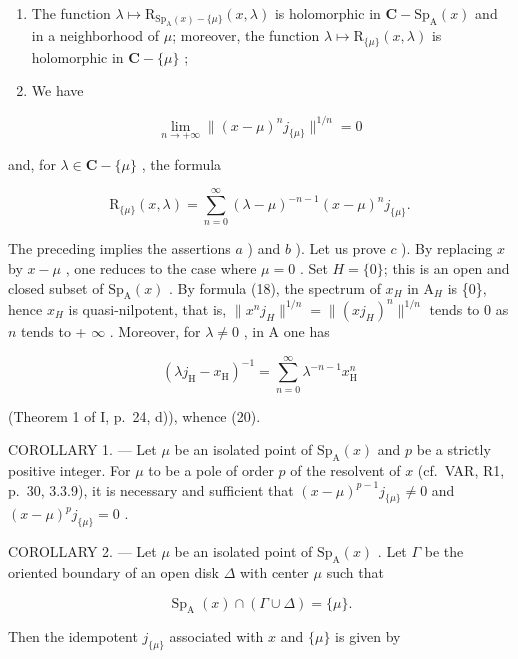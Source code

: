 \begin{enumerate}
\def\labelenumi{\alph{enumi})}
\setcounter{enumi}{1}
\item
  The function \(\lambda \mapsto \mathrm{R}_{\mathrm{Sp}_{\mathrm{A}}(x)-\{\mu\}}(x,\lambda)\) is holomorphic in \(\mathbf{C}-\mathrm{Sp}_{\mathrm{A}}(x)\) and in a neighborhood of \(\mu\); moreover, the function \(\lambda \mapsto \mathrm{R}_{\{\mu\}}(x,\lambda)\) is holomorphic in \(\mathbf{C}-\{\mu\}\) ;
\item
  We have
\end{enumerate}

\[
\lim _ {n \to + \infty} \| (x - \mu) ^ {n} j _ {\{\mu \}} \| ^ {1 / n} = 0
\]

and, for \(\lambda \in \mathbf{C} - \{\mu\}\) , the formula

\[
\mathrm{R} _ {\{\mu \}} (x, \lambda) = \sum_ {n = 0} ^ {\infty} (\lambda - \mu) ^ {- n - 1} (x - \mu) ^ {n} j _ {\{\mu \}}.\tag{20}
\]

The preceding implies the assertions \(a\) ) and \(b\) ). Let us prove \(c\) ). By replacing \(x\) by \(x-\mu\) , one reduces to the case where \(\mu=0\) . Set \(H = \{0\}\); this is an open and closed subset of \(\mathrm{Sp}_{\mathrm{A}}(x)\) . By formula (18), the spectrum of \(x_{H}\) in \(\mathrm{A}_{H}\) is \{0\}, hence \(x_{H}\) is quasi-nilpotent, that is, \(\|x^{n}j_{H}\|^{1/n}=\|(xj_{H})^{n}\|^{1/n}\) tends to 0 as \(n\) tends to + \(\infty\) . Moreover, for \(\lambda\neq0\) , in A one has

\[
\left(\lambda j _ {\mathrm{H}} - x _ {\mathrm{H}}\right) ^ {- 1} = \sum_ {n = 0} ^ {\infty} \lambda^ {- n - 1} x _ {\mathrm{H}} ^ {n}
\]

(Theorem 1 of I, p.~24, d)), whence (20).

COROLLARY 1. --- Let \(\mu\) be an isolated point of \(\mathrm{Sp}_{\mathrm{A}}(x)\) and \(p\) be a strictly positive integer. For \(\mu\) to be a pole of order \(p\) of the resolvent of \(x\) (cf.~VAR, R1, p.~30, 3.3.9), it is necessary and sufficient that \((x - \mu)^{p-1} j_{\{\mu\}} \neq 0\) and \((x - \mu)^{p} j_{\{\mu\}} = 0\) .

COROLLARY 2. --- Let \(\mu\) be an isolated point of \(\mathrm{Sp}_{\mathrm{A}}(x)\) . Let \(\Gamma\) be the oriented boundary of an open disk \(\Delta\) with center \(\mu\) such that

\[
\operatorname{Sp} _ {\mathrm{A}} (x) \cap (\Gamma \cup \Delta) = \{\mu \}.
\]

Then the idempotent \(j_{\{\mu \}}\) associated with \(x\) and \(\{\mu\}\) is given by

